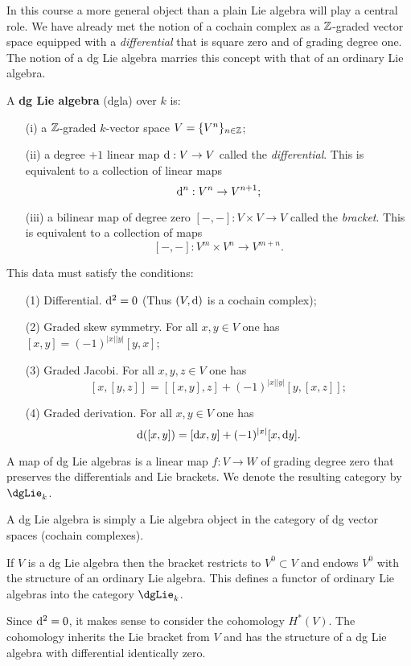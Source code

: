 \documentclass[11pt]{amsart}
\begin{document}
In this course a more general object than a plain Lie algebra will play a central role. 
We have already met the notion of a cochain complex as a $\mathbb Z$-graded vector space equipped with a {\em differential} that is square zero and of grading degree one. 
The notion of a dg Lie algebra marries this concept with that of an ordinary Lie algebra. 

\begin{dfn}
A {\bf dg Lie algebra} (dgla) over $k$ is:
\begin{enumerate}
\item[(i)] a $\mathbb Z$-graded $k$-vector space $V = \{V^n\}_{n \in \mathbb Z}$;
\item[(ii)] a degree $+1$ linear map ${\rm d} : V \to V$ called the {\em differential}.
This is equivalent to a collection of linear maps
\[
{\rm d}^n : V^n \to V^{n+1};
\]
\item[(iii)] a bilinear map of degree zero $[-,-] : V \times V \to V$ called the {\em bracket}. This is equivalent to a collection of maps
\[
[-,-] : V^m \times V^n \to V^{m+n}. 
\]
\end{enumerate}
This data must satisfy the conditions:
\begin{enumerate}
\item[(1)] Differential. ${\rm d}^2 = 0$ (Thus $(V,{\rm d})$ is a cochain complex);
\item[(2)] Graded skew symmetry. For all $x,y \in V$ one has $[x,y] = (-1)^{|x||y|} [y,x]$;
\item[(3)] Graded Jacobi. For all $x,y,z \in V$ one has
\[
[x,[y,z]] = [[x,y],z] + (-1)^{|x||y|} [y,[x,z]];
\]
\item[(4)] Graded derivation.
For all $x,y\in V$ one has
\[
{\rm d}([x,y]) = [{\rm d} x, y] + (-1)^{|x|} [x, {\rm d} y] .
\]
\end{enumerate}
A map of dg Lie algebras is a linear map $f : V \to W$ of grading degree zero that preserves the differentials and Lie brackets.
We denote the resulting category by $\dgLie_k$. 
\end{dfn}

\begin{rmk} A dg Lie algebra is simply a Lie algebra object in the category of dg vector spaces (cochain complexes). 
\end{rmk}

\begin{rmk}
If $V$ is a dg Lie algebra then the bracket restricts to $V^0 \subset V$ and endows $V^0$ with the structure of an ordinary Lie algebra.
This defines a functor of ordinary Lie algebras into the category $\dgLie_k$. 

Since ${\rm d}^2 = 0$, it makes sense to consider the cohomology $H^*(V)$. 
The cohomology inherits the Lie bracket from $V$ and has the structure of a dg Lie algebra with differential identically zero. 
\end{rmk}
\end{document}
